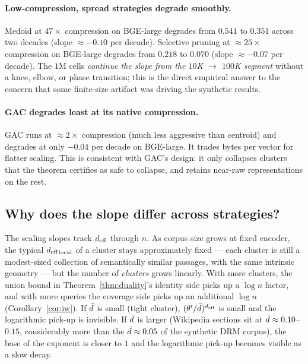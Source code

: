 \paragraph{Low-compression, spread strategies degrade smoothly.}
Medoid at $47\times$ compression on BGE-large degrades from
$0.541$ to $0.351$ across two decades (slope $\approx -0.10$ per
decade). Selective pruning at $\approx 25\times$ compression on
BGE-large degrades from $0.218$ to $0.070$ (slope $\approx -0.07$
per decade). The $1$M cells
\emph{continue the slope from the $10$K $\to$ $100$K segment} without
a knee, elbow, or phase transition; this is the direct empirical
answer to the concern that some finite-size artifact was driving the
synthetic results.

\paragraph{GAC degrades least at its native compression.} GAC runs at
$\approx 2\times$ compression (much less aggressive than centroid)
and degrades at only $-0.04$ per decade on BGE-large. It trades bytes
per vector for flatter scaling. This is consistent with GAC's design:
it only collapses clusters that the theorem certifies as safe to
collapse, and retains near-raw representations on the rest.

\subsection{Why does the slope differ across strategies?}
\label{sec:e5:mechanism}

The scaling slopes track ${d_{\mathrm{eff}}}$ through $n$. As corpus size grows at
fixed encoder, the typical ${d_{\mathrm{eff}}}_{\mathrm{local}}$ of a cluster stays
approximately fixed --- each cluster is still a modest-sized
collection of semantically similar passages, with the same intrinsic
geometry --- but the number of \emph{clusters} grows linearly. With
more clusters, the union bound in
Theorem~\ref{thm:duality}'s identity side picks up a $\log n$ factor,
and with more queries the coverage side picks up an additional $\log n$
(Corollary~\ref{cor:iw}). If $\bar{d}$ is small (tight cluster),
$(\theta'/\bar{d})^{{d_{\mathrm{eff}}}}$ is small and the logarithmic pick-up is
invisible. If $\bar{d}$ is larger (Wikipedia sections sit at $\bar{d}
\approx 0.10$--$0.15$, considerably more than the $\bar{d} \approx 0.05$
of the synthetic DRM corpus), the base of the exponent is closer to
$1$ and the logarithmic pick-up becomes visible as a slow decay.

